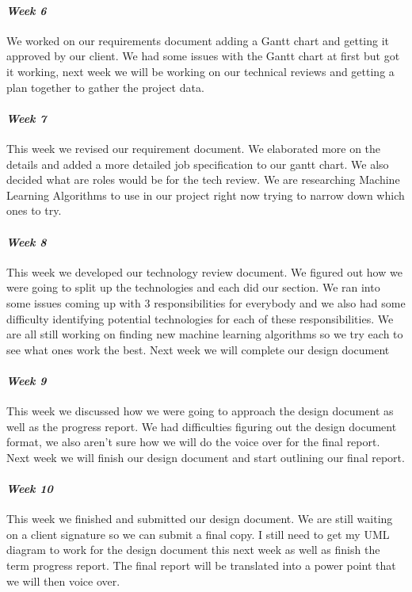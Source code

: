 \documentclass[onecolumn, draftclsnofoot,10pt, compsoc]{IEEEtran}
\begin{document}
\paragraph{\emph{Week 6}}
We worked on our requirements document adding a Gantt chart and getting it approved by our client. We had some issues with the Gantt chart at first but got it working, next week we will be working on our technical reviews and getting a plan together to gather the project data.
\paragraph{\emph{Week 7}}
This week we revised our requirement document. We elaborated more on the details and added a more detailed job specification to our gantt chart. We also decided what are roles would be for the tech review. We are researching Machine Learning Algorithms to use in our project right now trying to narrow down which ones to try.
\paragraph{\emph{Week 8}}
This week we developed our technology review document. We figured out how we were going to split up the technologies and each did our section. We ran into some issues coming up with 3 responsibilities for everybody and we also had some difficulty identifying potential technologies for each of these responsibilities. We are all still working on finding new machine learning algorithms so we try each to see what ones work the best. Next week we will complete our design document
\paragraph{\emph{Week 9}}
This week we discussed how we were going to approach the design document as well as the progress report. We had difficulties figuring out the design document format, we also aren't sure how we will do the voice over for the final report. Next week we will finish our design document and start outlining our final report.
\paragraph{\emph{Week 10}}
This week we finished and submitted our design document. We are still waiting on a client signature so we can submit a final copy. I still need to get my UML diagram to work for the design document this next week as well as finish the term progress report. The final report will be translated into a power point that we will then voice over.
\end{document}
